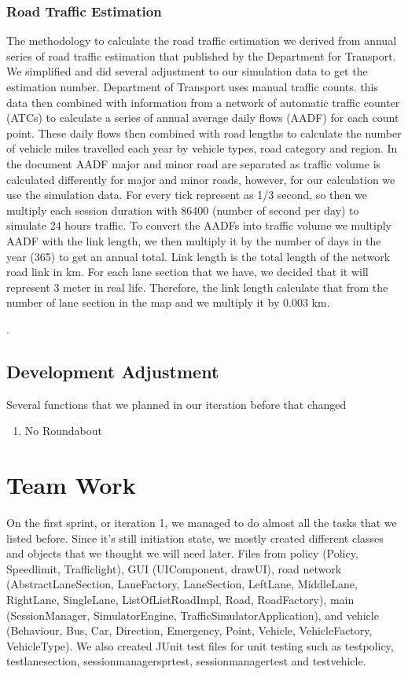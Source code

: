 \documentclass[11pt]{article}
\begin{document}
{\begin{itemize}
\subsubsection{Road Traffic Estimation} \label{rte}
The methodology to calculate the road traffic estimation we derived from annual series of road traffic estimation that published by the Department for Transport. We simplified and did several adjustment to our simulation data to get the estimation number. Department of Transport uses manual traffic counts. this data then combined with information from a network of automatic traffic counter (ATCs) to calculate a series of annual average daily flows (AADF) for each count point. These daily flows then combined with road lengths to calculate the number of vehicle miles travelled each year by vehicle types, road category and region. In the document AADF major and minor road are separated as traffic volume is calculated differently for major and minor roads, however, for our calculation we use the simulation data. For every tick represent as 1/3 second, so then we multiply each session duration with 86400 (number of second per day) to simulate 24 hours traffic. 
To convert the AADFs into traffic volume we multiply AADF with the link length, we then multiply it by the number of days in the year (365) to get an annual total. Link length is the total length of the network road link in km. For each lane section that we have, we decided that it will represent 3 meter in real life. Therefore, the link length calculate that from the number of lane section in the map and we multiply it by 0.003 km. 
\end{itemize}.
	
\subsection{Development Adjustment}
Several functions that we planned in our iteration before that changed
\begin{enumerate}[noitemsep]
	\item No Roundabout  
\end{enumerate}

\section{Team Work}
On the first sprint, or iteration 1, we managed to do almost all the tasks that we listed before. Since it's still initiation state, we mostly created different classes and objects that we thought we will need later. Files from policy (Policy, Speedlimit, Trafficlight), GUI (UIComponent, drawUI), road network (AbstractLaneSection, LaneFactory, LaneSection, LeftLane, MiddleLane, RightLane, SingleLane, ListOfListRoadImpl, Road, RoadFactory), main (SessionManager, SimulatorEngine, TrafficSimulatorApplication), and vehicle (Behaviour, Bus, Car, Direction, Emergency, Point, Vehicle, VehicleFactory, VehicleType). We also created JUnit test files for unit testing such as testpolicy, testlanesection, sessionmanagersprtest, sessionmanagertest and testvehicle. 

}
\end{document}
